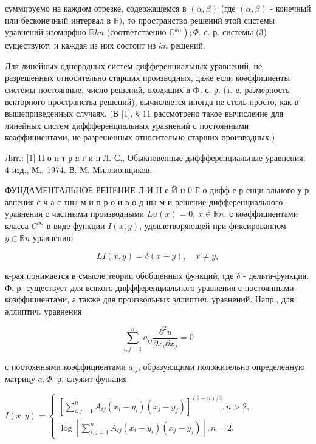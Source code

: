 \documentclass[10pt]{article}
\begin{document}
суммируемо на каждом отрезке, содержащемся в $(\alpha, \beta)$ (где $(\alpha, \beta)$ - конечный или бесконечный интервал в $\mathbb{R})$, то пространство решений этой системы уравнений изоморфно $\mathbb{R} k n$ (соответственно $\left.\mathbb{C}^{k n}\right) ; \Phi$. с. р. системы (3) существуют, и каждая из них состоит из $k n$ решений.



Для линейных однородных систем дифференциальных уравнений, не разрешенных относительно старших производных, даже если коәффициенты системы постоянные, число решений, входящих в Ф. с. р. (т. е. размерность векторного пространства решений), вычисляется иногда не столь просто, как в вышеприведенных случаях. (В [1], § 11 рассмотрено такое вычисление для линейных систем диффференциальных уравнений с постоянными коәффициентами, не разрешенных относительно старших производных.)



Лит.: [1] П о н т р я г и н Л. С., Обыкновенные диффференциальные уравнения, 4 изд., М., 1974. В. М. Миллионщиков.



ФУНДАМЕНТАЛЬНОЕ РЕIIEНИЕ Л И Н е Й н 0 Г о дифф е р енци ального у р авнения с ч а с тны м и п р о и в о д ны м и-решение дифференциального уравнения с частными производными $L u(x)=0$, $x \in \mathbb{R} n$, с коәффициентами класса $C^{\infty}$ в виде функции $I(x, y)$, удовлетворяющей при фиксированном $y \in \mathbb{R} n$ уравнению



\[

L I(x, y)=\delta(x-y), \quad x \neq y,

\]



к-рая понимается в смысле теории обобщенных функций, где $\delta$ - дельта-функция. Ф. р. существует для всякого диффференциального уравнения с постоянными коэффициентами, а также для произвольных эллиптич. уравнений. Напр., для әллиптич. уравнения



\[

\sum_{i, j=1}^{n} a_{i j} \frac{\partial^{2} u}{\partial x_{i} \partial x_{j}}=0

\]



с постоянными коэффициентами $a_{i j}$, образующими положительно определенную матрицу $a, \Phi$. р. служит функция



$I(x, y)=\left\{\begin{array}{l}{\left[\sum_{i, j=1}^{n} A_{i j}\left(x_{i}-y_{i}\right)\left(x_{j}-y_{j}\right)\right]^{(2-n) / 2}, n>2,} \\ \log \left[\sum_{i, j=1}^{n} A_{i j}\left(x_{i}-y_{i}\right)\left(x_{j}-y_{j}\right)\right], n=2,\end{array}\right.$
\end{document}
